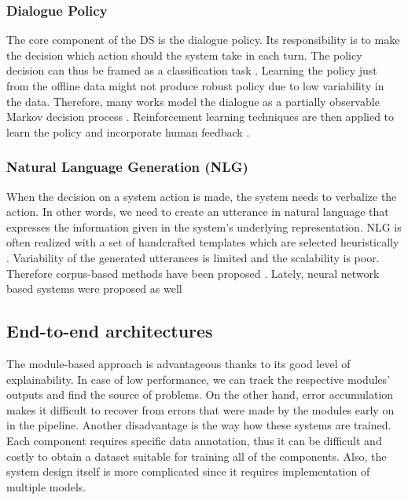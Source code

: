\subsubsection{Dialogue Policy} The core component of the DS is the dialogue policy.
Its responsibility is to make the decision which action should the system take in each turn.
The policy decision can thus be framed as a classification task \cite{gavsic2013gaussian}.
Learning the policy just from the offline data might not produce robust policy due to low variability in the data.
Therefore, many works model the dialogue  as a partially observable Markov decision process \cite{gavsic2010gaussian, thomson2010bayesian}.
Reinforcement learning techniques are then applied to learn the policy and incorporate human  feedback \cite{peng2017composite, su2016line}.

\subsubsection{Natural Language Generation (NLG)} When the decision on a system action is made, the system needs to verbalize the action.
In other words, we need to create an utterance in natural language that expresses the information given in the system's underlying representation.
NLG is often realized with a set of handcrafted templates which are selected heuristically \cite{rudnicky_creating_1999}.
Variability of the generated utterances is limited and the scalability is poor.
Therefore corpus-based methods have been proposed \cite{oh2000stochastic, mairesse-young-2014-stochastic}.
Lately, neural network based systems were proposed as well \cite{wen-etal-2015-semantically, wen-etal-2016-multi}

\subsection{End-to-end architectures}
\label{sec:relwork-end-to-end}
The module-based approach is advantageous thanks to its good level of explainability.
In case of low performance, we can track the respective modules' outputs and find the source of problems.
On the other hand, error accumulation makes it difficult to recover from errors that were made by the modules early on in the pipeline.
Another disadvantage is the way how these systems are trained.
Each component requires specific data annotation, thus it can be difficult and costly to obtain a dataset suitable for training all of the components.
Also, the system design itself is more complicated since it requires implementation of multiple models.

